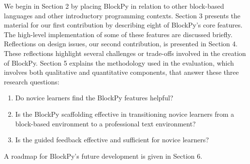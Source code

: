\documentclass[10pt,journal,compsoc]{IEEEtran}
\begin{document}
 
We begin in Section 2 by placing BlockPy in relation to other block-based languages and other introductory programming contexts. 
Section 3 presents the material for our first contribution by describing eight of BlockPy's core features. The high-level implementation of some of these features are discussed briefly.
Reflections on design issues, our second contribution, is presented in Section 4. These reflections highlight several challenges or trade-offs involved in the creation of BlockPy.
Section 5 explains the methodology used in the evaluation, which involves both qualitative and quantitative components, that answer these three research questions:
\begin{enumerate}
	\item Do novice learners find the BlockPy features helpful?
    \item Is the BlockPy scaffolding effective in transitioning novice learners from a block-based environment to a professional text environment?
    \item Is the guided feedback effective and sufficient for novice learners?
\end{enumerate}
A roadmap for BlockPy's future development is given in Section 6.



\end{document}
